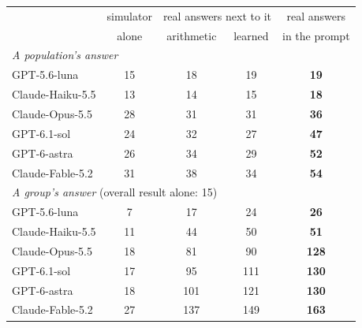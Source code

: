 \begin{tabular}{lcccc}
\toprule
 & simulator & \multicolumn{2}{c}{real answers next to it} & real answers \\
 & alone & arithmetic & learned & in the prompt \\
\midrule
\multicolumn{5}{l}{\emph{A population's answer}} \\
GPT-5.6-luna & 15 & 18 & 19 & \textbf{19} \\
Claude-Haiku-5.5 & 13 & 14 & 15 & \textbf{18} \\
Claude-Opus-5.5 & 28 & 31 & 31 & \textbf{36} \\
GPT-6.1-sol & 24 & 32 & 27 & \textbf{47} \\
GPT-6-astra & 26 & 34 & 29 & \textbf{52} \\
Claude-Fable-5.2 & 31 & 38 & 34 & \textbf{54} \\
\midrule
\multicolumn{5}{l}{\emph{A group's answer} (overall result alone: 15)} \\
GPT-5.6-luna & 7 & 17 & 24 & \textbf{26} \\
Claude-Haiku-5.5 & 11 & 44 & 50 & \textbf{51} \\
Claude-Opus-5.5 & 18 & 81 & 90 & \textbf{128} \\
GPT-6.1-sol & 17 & 95 & 111 & \textbf{130} \\
GPT-6-astra & 18 & 101 & 121 & \textbf{130} \\
Claude-Fable-5.2 & 27 & 137 & 149 & \textbf{163} \\
\bottomrule
\end{tabular}
